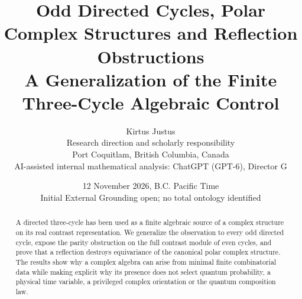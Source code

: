 \documentclass[11pt,letterpaper]{article}
\title{\textbf{Odd Directed Cycles, Polar Complex Structures and Reflection Obstructions}\\[3pt]\large A Generalization of the Finite Three-Cycle Algebraic Control}
\author{Kirtus Justus\\\small Research direction and scholarly responsibility\\\small Port Coquitlam, British Columbia, Canada\\[3pt]\small AI-assisted internal mathematical analysis: ChatGPT (GPT-6), Director G}
\date{12 November 2026, B.C. Pacific Time\\\small Initial External Grounding open; no total ontology identified}
\begin{document}
\maketitle
\begin{abstract}
A directed three-cycle has been used as a finite algebraic source of a complex structure on its real contrast representation. We generalize the observation to every odd directed cycle, expose the parity obstruction on the full contrast module of even cycles, and prove that a reflection destroys equivariance of the canonical polar complex structure. The results show why a complex algebra can arise from minimal finite combinatorial data while making explicit why its presence does not select quantum probability, a physical time variable, a privileged complex orientation or the quantum composition law.
\end{abstract}
\end{document}
